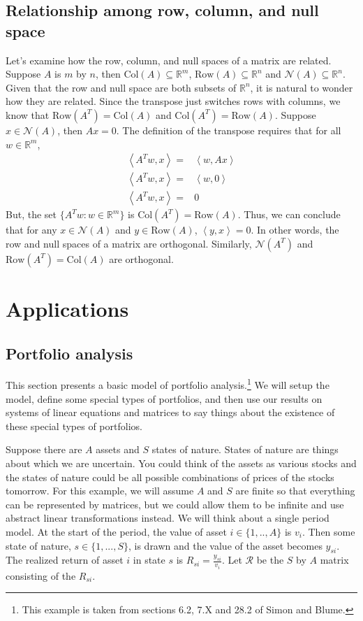 \documentclass[12pt,reqno]{amsart}
\theoremstyle{definition}
\def\R{\mathbb{R}}
\newcommand{\iprod}[2]{\left\langle {#1} , {#2} \right\rangle}
\newcommand{\row}{\mathrm{Row}}
\newcommand{\col}{\mathrm{Col}}
\begin{document}
\subsection{Relationship among row, column, and null space}

Let's examine how the row, column, and null spaces of a matrix are
related. Suppose $A$ is $m$ by $n$, then $\col(A) \subseteq \R^m$,
$\row(A) \subseteq \R^n$ and $\mathcal{N}(A) \subseteq \R^n$. Given
that the row and null space are both subsets of $\R^n$, it is natural
to wonder how they are related. Since
the transpose just switches rows with columns, we know that $\row(A^T)
= \col(A)$ and $\col(A^T) = \row(A)$. Suppose $x \in \mathcal{N}(A)$,
then $A x = 0$. The definition of the transpose requires that for all
$w \in \R^m$, 
\begin{align*} 
  \iprod{A^T w}{x} = & \iprod{w}{Ax} \\
  \iprod{A^T w}{x} = & \iprod{w}{0} \\
  \iprod{A^T w}{x} = & 0
\end{align*}
But, the set $\{A^T w: w \in \R^m \}$ is $\col(A^T) = \row(A)$. Thus,
we can conclude that for any $x \in \mathcal{N}(A)$ and $y \in
\row(A)$, $\iprod{y}{x} = 0$. In other words, the row and null spaces
of a matrix are orthogonal. Similarly, $\mathcal{N}(A^T)$ and
$\row(A^T) = \col(A)$ are orthogonal. 

\section{Applications}

\subsection{Portfolio analysis}

This section presents a basic model of portfolio
analysis.\footnote{This example is taken from sections 6.2, 7.X and
  28.2 of Simon and Blume.} We will setup the model, define some
special types of portfolios, and then use our results on systems of
linear equations and matrices to say things about the existence of
these special types of portfolios. 

Suppose there are $A$ assets and $S$ states of nature. States of
nature are things about which we are uncertain. You could think of the
assets as various stocks and the states of nature could be all
possible combinations of prices of the stocks tomorrow. For this
example, we will assume $A$ and $S$ are finite so that everything can
be represented by matrices, but we could allow them to be infinite and
use abstract linear transformations instead.  We will think about a
single period model. At the start of the period, the value of asset $i
\in \{1,..,A\}$ is $v_i$. Then some state of nature, $s \in \{1, ...,
S\}$, is drawn and the value of the asset becomes $y_{si}$. The
realized return of asset $i$ in state $s$ is $R_{si} =
\frac{y_{si}}{v_i}$. Let $\mathcal{R}$ be the $S$ by $A$ matrix
consisting of the $R_{si}$.
\end{document}
